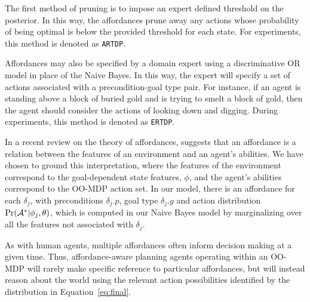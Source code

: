 \documentclass[conference]{IEEEtran}
\newcommand{\stnote}[1]{\textcolor{Blue}{\textbf{S: #1}}}
\newcommand{\dnote}[1]{\textcolor{Green}{\textbf{D: #1}}}
\begin{document}
The first method of pruning is to impose an expert defined threshold on the posterior. In this way, the affordances prune away any actions whose probability of being optimal is below the provided threshold for each state. For experiments, this method is denoted as \texttt{ARTDP}.

Affordances may also be specified by a domain expert using a discriminative OR model in place of the Naive Bayes. In this way, the expert will specify a set of actions associated with a precondition-goal type pair. For instance, if an agent is standing above a block of buried gold and is trying to smelt a block of gold, then the agent should consider the actions of looking down and digging. During experiments, this method is denoted as \texttt{ERTDP}.


In a recent review on the theory of affordances, \citet{chemero2003} suggests that an affordance is a relation between the features of an environment and an agent's abilities. We have chosen to ground this interpretation, where the features of the environment correspond to the goal-dependent state features, $\phi$, and the agent's abilities correspond to the OO-MDP action set. In our model, there is an affordance for each $\delta_j$, with preconditions $\delta_j.p$, goal type $\delta_j.g$ and action distribution $\Pr({\cal A}^* | \phi_j, \theta)$, which is computed in our Naive Bayes model by marginalizing over all the features not associated with $\delta_j$.

  
As with human agents, multiple affordances often inform decision making at a given time.
Thus, affordance-aware planning agents operating within an OO-MDP will
rarely make specific reference to particular affordances, but will
instead reason about the world using the relevant action possibilities
identified by the distribution in Equation~\ref{eq:final}. 
\end{document}

